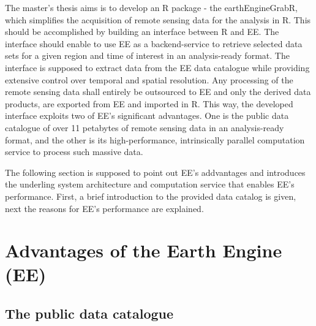 The master's thesis aims is to develop an R package - the earthEngineGrabR, which simplifies the acquisition of remote sensing data for the analysis in R. This should be accomplished by building an interface between R and EE.
The interface should enable to use EE as a backend-service to retrieve selected data sets for a given region and time of interest in an analysis-ready format. The interface is supposed to extract data from the EE data catalogue while providing extensive control over temporal and spatial resolution. 
Any processing of the remote sensing data shall entirely be outsourced to EE and only the derived data products, are exported from EE and imported in R. This way, the developed interface exploits two of EE's significant advantages. One is the public data catalogue of over 11 petabytes of remote sensing data in an analysis-ready format, and the other is its high-performance, intrinsically parallel computation service to process such massive data.


The following section is supposed to point out EE's addvantages and introduces the underling system architecture and computation service that enables EE's performance. First, a brief introduction to the provided data catalog is given, next the reasons for EE's performance are explained.


\section{Advantages of the Earth Engine (EE)}

\subsection{The public data catalogue}


